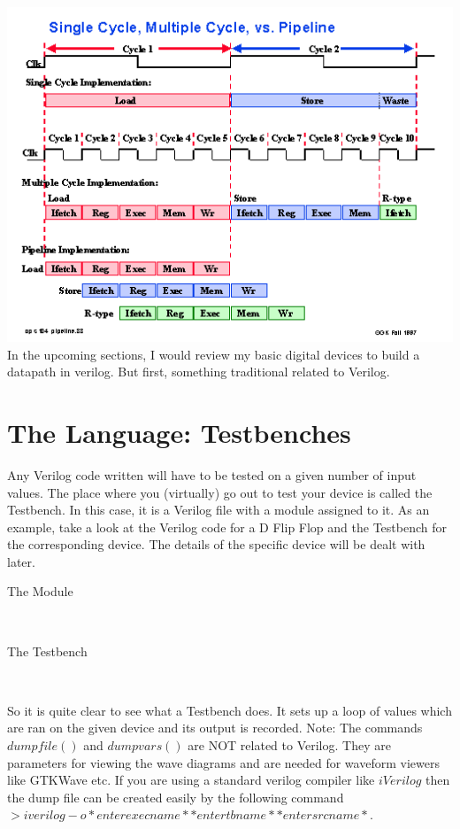 \documentclass[11pt]{article}
\begin{document}
\includegraphics[scale=1.15]{smpp.png}
In the upcoming sections, I would review my basic digital devices to build a datapath in verilog. But first, something traditional related to Verilog.
\section{The Language: Testbenches}
Any Verilog code written will have to be tested on a given number of input values. The place where you (virtually) go out to test your device is called the Testbench. In this case, it is a Verilog file with a module assigned to it. As an example, take a look at the Verilog code for a D Flip Flop and the Testbench for the corresponding device. The details of the specific device will be dealt with later.
\begin{description}
	\item[The Module] \hfill \\
	
	\item[The Testbench] \hfill \\
	
\end{description}

So it is quite clear to see what a Testbench does. It sets up a loop of values which are ran on the given device and its output is recorded. Note: The commands $dumpfile()$ and $dumpvars()$ are NOT related to Verilog. They are parameters for viewing the wave diagrams and are needed for waveform viewers like GTKWave etc. If you are using a standard verilog compiler like $iVerilog$ then the dump file can be created easily by the following command $> iverilog -o *enter exec name* *enter tb name* *enter src name*.$
\end{document}
